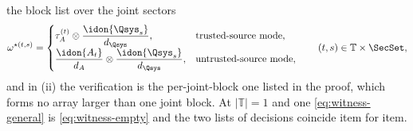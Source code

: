\begin{theorem}
the block list over the joint sectors
\begin{equation}\label{eq:witness-general}
  \omega^{\star(t,s)}=
  \begin{cases}
    \tau^{(t)}_A\otimes\dfrac{\idon{\Qsys_s}}{d_{\Qsys}},
      & \text{trusted-source mode},\\[1.2ex]
    \dfrac{\idon{A_t}}{d_A}\otimes\dfrac{\idon{\Qsys_s}}{d_{\Qsys}},
      & \text{untrusted-source mode},
  \end{cases}
  \qquad (t,s)\in\mathbb{T}\times\SecSet ,
\end{equation}
and in (ii) the verification is the per-joint-block one listed in the proof,
which forms no array larger than one joint block. At $|\mathbb{T}|=1$ and one
 \eqref{eq:witness-general} is \eqref{eq:witness-empty}
and the two lists of decisions coincide item for item.
\end{theorem}

